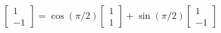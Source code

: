 \documentclass[preview]{standalone}
\begin{document}
\begin{center}
$\begin{bmatrix} 1 \\ -1\end{bmatrix} =\cos(\pi/2) \begin{bmatrix} 1 \\ 1\end{bmatrix} + \sin(\pi/2) \begin{bmatrix} 1 \\ -1\end{bmatrix}$
\end{center}
\end{document}
